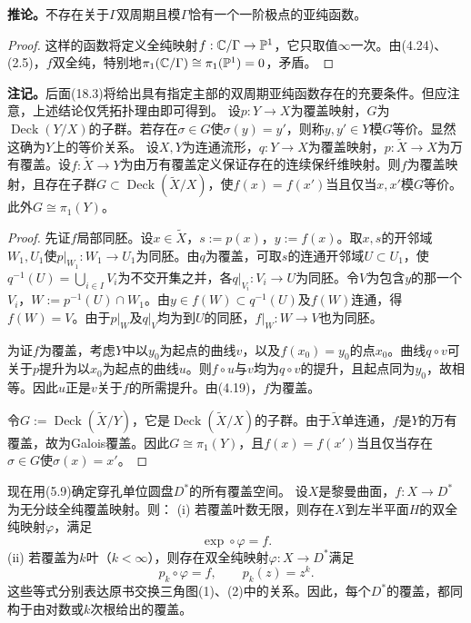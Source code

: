 \textbf{推论。}不存在关于$\Gamma$双周期且模$\Gamma$恰有一个一阶极点的亚纯函数。
\begin{proof}
这样的函数将定义全纯映射$f:\mathbb C/\Gamma\to\mathbb P^1$，它只取值$\infty$一次。由(4.24)、(2.5)，$f$双全纯，特别地$\pi_1(\mathbb C/\Gamma)\cong\pi_1(\mathbb P^1)=0$，矛盾。
\end{proof}
\textbf{注记。}后面(18.3)将给出具有指定主部的双周期亚纯函数存在的充要条件。但应注意，上述结论仅凭拓扑理由即可得到。
设$p:Y\to X$为覆盖映射，$G$为$\operatorname{Deck}(Y/X)$的子群。若存在$\sigma\in G$使$\sigma(y)=y'$，则称$y,y'\in Y$模$G$等价。显然这确为$Y$上的等价关系。
设$X,Y$为连通流形，$q:Y\to X$为覆盖映射，$p:\widetilde X\to X$为万有覆盖。设$f:\widetilde X\to Y$为由万有覆盖定义保证存在的连续保纤维映射。则$f$为覆盖映射，且存在子群$G\subset\operatorname{Deck}(\widetilde X/X)$，使$f(x)=f(x')$当且仅当$x,x'$模$G$等价。此外$G\cong\pi_1(Y)$。
\begin{proof}
先证$f$局部同胚。设$x\in\widetilde X$，$s:=p(x)$，$y:=f(x)$。取$x,s$的开邻域$W_1,U_1$使$p|_{W_1}:W_1\to U_1$为同胚。由$q$为覆盖，可取$s$的连通开邻域$U\subset U_1$，使$q^{-1}(U)=\bigcup_{i\in I}V_i$为不交开集之并，各$q|_{V_i}:V_i\to U$为同胚。令$V$为包含$y$的那一个$V_i$，$W:=p^{-1}(U)\cap W_1$。由$y\in f(W)\subset q^{-1}(U)$及$f(W)$连通，得$f(W)=V$。由于$p|_W$及$q|_V$均为到$U$的同胚，$f|_W:W\to V$也为同胚。

为证$f$为覆盖，考虑$Y$中以$y_0$为起点的曲线$v$，以及$f(x_0)=y_0$的点$x_0$。曲线$q\circ v$可关于$p$提升为以$x_0$为起点的曲线$u$。则$f\circ u$与$v$均为$q\circ v$的提升，且起点同为$y_0$，故相等。因此$u$正是$v$关于$f$的所需提升。由(4.19)，$f$为覆盖。

令$G:=\operatorname{Deck}(\widetilde X/Y)$，它是$\operatorname{Deck}(\widetilde X/X)$的子群。由于$\widetilde X$单连通，$f$是$Y$的万有覆盖，故为Galois覆盖。因此$G\cong\pi_1(Y)$，且$f(x)=f(x')$当且仅当存在$\sigma\in G$使$\sigma(x)=x'$。
\end{proof}
现在用(5.9)确定穿孔单位圆盘$D^*$的所有覆盖空间。
设$X$是黎曼曲面，$f:X\to D^*$为无分歧全纯覆盖映射。则：
(i) 若覆盖叶数无限，则存在$X$到左半平面$H$的双全纯映射$\varphi$，满足
\begin{equation}\exp\circ\varphi=f.\tag{1}\end{equation}
(ii) 若覆盖为$k$叶（$k<\infty$），则存在双全纯映射$\varphi:X\to D^*$满足
\begin{equation}p_k\circ\varphi=f,\qquad p_k(z)=z^k.\tag{2}\end{equation}
这些等式分别表达原书交换三角图(1)、(2)中的关系。因此，每个$D^*$的覆盖，都同构于由对数或$k$次根给出的覆盖。
